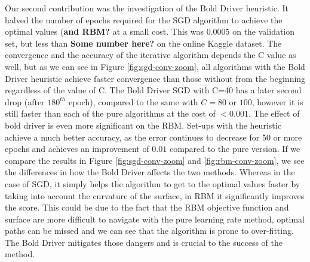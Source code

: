 \documentclass[10pt,conference,compsocconf]{IEEEtran}
\begin{document}
Our second contribution was the investigation of the Bold Driver heuristic. It halved the number of epochs required for the SGD algorithm to achieve the optimal values (\textbf{and RBM?} at a small cost. This was 0.0005 on the validation set, but less than \textbf{Some number here?} on the online Kaggle dataset. The convergence and the accuracy of the iterative algorithm depends the C value as well, but as we can see in Figure \ref{fig:sgd-conv-zoom}, all algorithms with the Bold Driver heuristic achieve faster convergence than those without from the beginning regardless of the value of C. The Bold Driver SGD with C=40 has a later second drop (after $180^{th}$ epoch), compared to the same with $C=80$ or $100$, however it is still faster than each of the pure algorithms at the cost of $<0.001$. The effect of bold driver is even more significant on the RBM. Set-ups with the heuristic achieve a much better accuracy, as the error continues to decrease for 50 or more epochs and achieves an improvement of $0.01$ compared to the pure version. If we compare the results in Figure \ref{fig:sgd-conv-zoom} and \ref{fig:rbm-conv-zoom}, we see the differences in how the Bold Driver affects the two methods. Whereas in the case of SGD, it simply helps the algorithm to get to the optimal values faster by taking into account the curvature of the surface, in RBM it significantly improves the score. This could be due to the fact that the RBM objective function and surface are more difficult to navigate with the pure learning rate method, optimal paths can be missed and we can see that the algorithm is prone to over-fitting. The Bold Driver mitigates those dangers and is crucial to the success of the method. 




%
%
\end{document}
